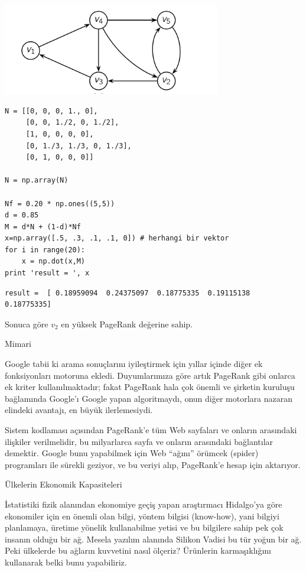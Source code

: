 \documentclass[12pt,fleqn]{article}\usepackage{../../common}
\begin{document}
\includegraphics[height=4cm]{pg3.png}

\begin{verbatim}
N = [[0, 0, 0, 1., 0],
     [0, 0, 1./2, 0, 1./2],
     [1, 0, 0, 0, 0],
     [0, 1./3, 1./3, 0, 1./3],
     [0, 1, 0, 0, 0]]

N = np.array(N)

Nf = 0.20 * np.ones((5,5))
d = 0.85
M = d*N + (1-d)*Nf
x=np.array([.5, .3, .1, .1, 0]) # herhangi bir vektor
for i in range(20): 
    x = np.dot(x,M)
print 'result = ', x 
\end{verbatim}

\begin{verbatim}
result =  [ 0.18959094  0.24375097  0.18775335  0.19115138  0.18775335]
\end{verbatim}

Sonuca göre $v_2$ en yüksek PageRank değerine sahip. 

Mimari

Google tabii ki arama sonuçlarını iyileştirmek için yıllar içinde diğer ek
fonksiyonları motoruna ekledi. Duyumlarımıza göre artık PageRank gibi
onlarca ek kriter kullanılmaktadır; fakat PageRank hala çok önemli ve
şirketin kuruluşu bağlamında Google'ı Google yapan algoritmaydı, onun diğer
motorlara nazaran elindeki avantajı, en büyük ilerlemesiydi.

Sistem kodlaması açısından PageRank'e tüm Web sayfaları ve onların
arasındaki ilişkiler verilmelidir, bu milyarlarca sayfa ve onların
arasındaki bağlantılar demektir. Google bunu yapabilmek için Web ``ağını''
örümcek (spider) programları ile sürekli geziyor, ve bu veriyi alıp,
PageRank'e hesap için aktarıyor.

Ülkelerin Ekonomik Kapasiteleri

İstatistiki fizik alanından ekonomiye geçiş yapan araştırmacı Hidalgo'ya
göre ekonomiler için en önemli olan bilgi, yöntem bilgisi (know-how), yani
bilgiyi planlamaya, üretime yönelik kullanabilme yetisi ve bu bilgilere
sahip pek çok insanın olduğu bir ağ. Mesela yazılım alanında Silikon Vadisi
bu tür yoğun bir ağ. Peki ülkelerde bu ağların kuvvetini nasıl ölçeriz?
Ürünlerin karmaşıklığını kullanarak belki bunu yapabiliriz. 
\end{document}
